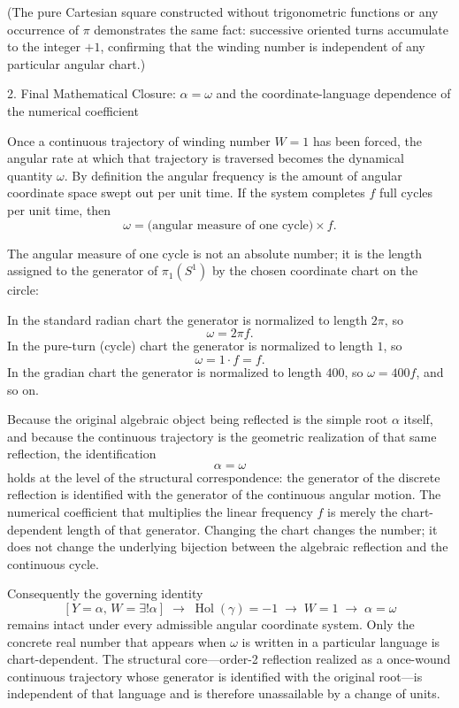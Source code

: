 (The pure Cartesian square constructed without trigonometric functions or any occurrence of \(\pi\) demonstrates the same fact: successive oriented turns accumulate to the integer \(+1\), confirming that the winding number is independent of any particular angular chart.)

2. Final Mathematical Closure: \(\alpha=\omega\) and the coordinate-language dependence of the numerical coefficient

Once a continuous trajectory of winding number \(W=1\) has been forced, the angular rate at which that trajectory is traversed becomes the dynamical quantity \(\omega\). By definition the angular frequency is the amount of angular coordinate space swept out per unit time. If the system completes \(f\) full cycles per unit time, then
\[
\omega=\bigl(\text{angular measure of one cycle}\bigr)\times f.
\]

The angular measure of one cycle is not an absolute number; it is the length assigned to the generator of \(\pi_1(S^1)\) by the chosen coordinate chart on the circle:

In the standard radian chart the generator is normalized to length \(2\pi\), so
  \[
  \omega=2\pi f.
  \]
In the pure-turn (cycle) chart the generator is normalized to length \(1\), so
  \[
  \omega=1\cdot f=f.
  \]
In the gradian chart the generator is normalized to length \(400\), so \(\omega=400f\), and so on.

Because the original algebraic object being reflected is the simple root \(\alpha\) itself, and because the continuous trajectory is the geometric realization of that same reflection, the identification
\[
\alpha=\omega
\]
holds at the level of the structural correspondence: the generator of the discrete reflection is identified with the generator of the continuous angular motion. The numerical coefficient that multiplies the linear frequency \(f\) is merely the chart-dependent length of that generator. Changing the chart changes the number; it does not change the underlying bijection between the algebraic reflection and the continuous cycle.

Consequently the governing identity
\[
[Y=\alpha,\,W=\exists!\alpha]\;\longrightarrow\;\operatorname{Hol}(\gamma)=-1\;\longrightarrow\;W=1\;\longrightarrow\;\alpha=\omega
\]
remains intact under every admissible angular coordinate system. Only the concrete real number that appears when \(\omega\) is written in a particular language is chart-dependent. The structural core—order-2 reflection realized as a once-wound continuous trajectory whose generator is identified with the original root—is independent of that language and is therefore unassailable by a change of units.

